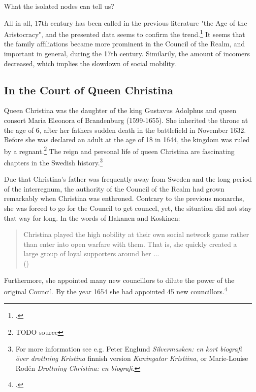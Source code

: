 What the isolated nodes can tell us?

All in all, 17th century has been called in the previous literature "the Age of the Aristocracy", and the presented data seems to confirm the trend.\footcite{hakanenAndHaikari2020} It seems that the family affiliations became more prominent in the Council of the Realm, and important in general, during the 17th century. Similarily, the amount of incomers decreased, which implies the slowdown of social mobility.

\subsection{In the Court of Queen Christina}
\label{christina}



Queen Christina was the daughter of the king Gustavus Adolphus and queen consort Maria Eleonora of Brandenburg (1599-1655). She inherited the throne at the age of 6, after her fathers sudden death in the battlefield in November 1632. Before she was declared an adult at the age of 18 in 1644, the kingdom was ruled by a regnant.\footnote{TODO source} The reign and personal life of queen Christina are fascinating chapters in the Swedish history.\footnote{For more information see e.g. Peter Englund \textit{Silvermasken: en kort biografi över drottning Kristina} finnish version \textit{Kuningatar Kristiina}, or Marie-Louise Rodén \textit{Drottning Christina: en biografi}.}

Due that Christina's father was frequently away from Sweden and the long period of the interregnum, the authority of the Council of the Realm had grown remarkably when Christina was enthroned. Contrary to the previous monarchs, she was forced to go for the Council to get councel, yet, the situation did not stay that way for long. In the words of Hakanen and Koskinen: 

\begin{quote}
	Christina played the high nobility at their own social network game rather than enter into open warfare with them. That is, she quickly created a large group of loyal supporters around her $\dots$\\
	(\cite[p. 64]{HakanenAKoskinen2017})
\end{quote}

Furthermore, she appointed many new councillors to dilute the power of the original Council. By the year 1654 she had appointed 45 new councillors.\footcite[p. 64.]{HakanenAKoskinen2017}


